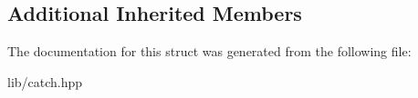 \subsection*{Additional Inherited Members}


The documentation for this struct was generated from the following file\+:\begin{DoxyCompactItemize}
\item 
lib/catch.\+hpp\end{DoxyCompactItemize}
